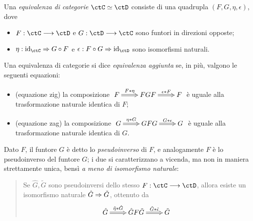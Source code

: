 \begin{definition}\label{funtore_equcat}
	Una \emph{equivalenza di categorie} \(\ctC\simeq\ctD\) consiste di una quadrupla \((F,G,\eta,\epsilon)\), dove
	\begin{itemize}
		\item \(F : \ctC\fun\ctD\) e \(G : \ctD\fun\ctC\) sono funtori in direzioni opposte;
		\item \(\eta : \Id[\ctC] \nat G\cmp F\) e \(\epsilon : F\cmp G \nat \Id[\ctD]\) sono isomorfismi naturali.
	\end{itemize}
	Una equivalenza di categorie si dice \emph{equivalenza aggiunta} se, in più, valgono le seguenti equazioni:
	\begin{itemize}
		\item (equazione zig) la composizione \(\xymatrix{F \ar@{=>}[r]^-{F\whi\eta} & FGF \ar@{=>}[r]^-{\epsilon\whi F} & F}\) è uguale alla trasformazione naturale identica di \(F\);
		\item (equazione zag) la composizione \(\xymatrix{G \ar@{=>}[r]^-{\eta\whi G} & GFG \ar@{=>}[r]^-{G\whi\epsilon} & G}\) è uguale alla trasformazione naturale identica di \(G\).
	\end{itemize}
	Dato \(F\), il funtore \(G\) è detto lo \emph{pseudoinverso} di \(F\), e analogamente \(F\) è lo pseudoinverso del funtore \(G\); i due si caratterizzano a vicenda, ma non in maniera strettamente unica, bensì \emph{a meno di isomorfismo naturale}:
	\begin{quote}
		Se \(\hat G,\tilde G\) sono pseudoinversi dello stesso \(F : \ctC\fun\ctD\), allora esiste un isomorfismo naturale \(\hat G\Rightarrow \tilde G\), ottenuto da
		\[\xymatrix{\hat G \ar@{=>}[r]^-{\tilde\eta\whi\hat G } & \hat G F \tilde G \ar@{=>}[r]^-{\tilde G \whi \hat\epsilon} & \tilde G}\]
	\end{quote}
\end{definition}
